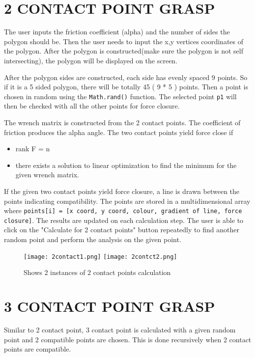 \documentclass[letterpaper, 10 pt, conference]{ieeeconf}
\begin{document}
    \section{2 CONTACT POINT GRASP}
    The user inputs the friction coefficient (alpha) and the number of sides the polygon should be. Then the user needs to input the x,y vertices coordinates of the polygon. After the polygon is constructed(make sure the polygon is not self intersecting), the polygon will be displayed on the screen. 
    
    After the polygon sides are constructed, each side has evenly spaced 9 points. So if it is a 5  sided polygon, there will be totally 45 ( 9 * 5 ) points. Then a point is chosen in random using the {\tt\small Math.rand()} function. The selected point {\tt\small p1} will then be checked with all the other points for force closure. 
    
    The wrench matrix is constructed from the 2 contact points. The coefficient of friction produces the alpha angle. The two contact points yield force close if 
    
    \begin{itemize}
        \item rank F = n
        \item there exists a solution to linear optimization to find the minimum for the given wrench matrix.
    \end{itemize}
    
    If the given two contact points yield force closure, a line is drawn between the points indicating compatibility. The points are stored in a  multidimensional array where {\tt points[i] = [x coord, y coord, colour, gradient of line, force closure]}. The results are updated on each calculation step. The user is able to click on the "Calculate for 2 contact points" button repeatedly to find another random point and perform the analysis on the given point.  
    
    
    \begin{figure}[h]
    \caption{Shows 2 instances of 2 contact points calculation}
    \texttt{[image: 2contact1.png]}
    \texttt{[image: 2contct2.png]}
    \end{figure}
    
    \section{3 CONTACT POINT GRASP}
    Similar to 2 contact point, 3 contact point is calculated with a given random point and 2 compatible points are chosen. This is done recursively when 2 contact points are compatible.
    
\end{document}
